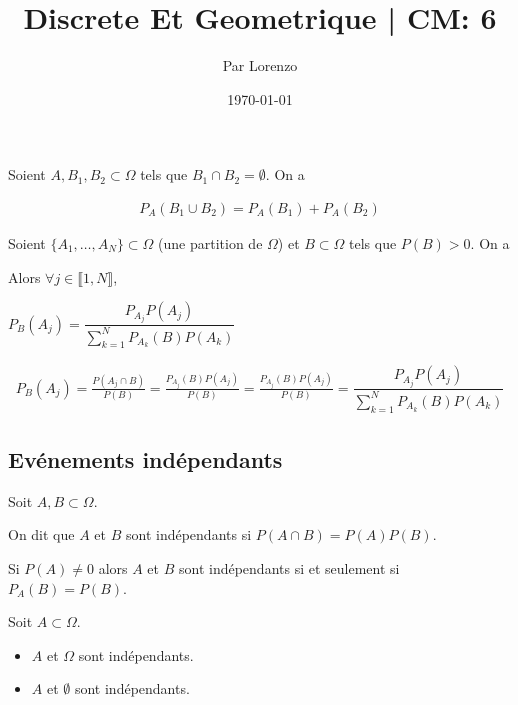 \documentclass[a4paper, 12pt]{article}
\title{Discrete Et Geometrique | CM: 6}
\author{Par Lorenzo}
\date{\today}
\begin{document}
\maketitle

Soient $A, B_1, B_2 \subset \Omega$ tels que $B_1 \cap B_2 = \emptyset$. On a

\begin{align*}
    P_A(B_1 \cup B_2) = P_A(B_1) + P_A(B_2)
\end{align*}

\begin{proposition}
Soient $\{A_1, \dots, A_N\} \subset \Omega$ (une partition de $\Omega$) et $B \subset \Omega$ tels que $P(B) > 0$. On a

Alors $\forall j \in \llbracket 1, N \rrbracket$,

$P_B(A_j) = \dfrac{P_{A_j}P(A_j)}{\sum_{k=1}^{N}P_{A_k}(B)P(A_k)}$
    
\end{proposition}

\begin{demonstration}
    \begin{align*}
        P_B(A_j) = \frac{P(A_j \cap B)}{P(B)} = \frac{P_{A_j}(B)P(A_j)}{P(B)} = \frac{P_{A_j}(B)P(A_j)}{P(B)} = \dfrac{P_{A_j}P(A_j)}{\sum_{k=1}^{N}P_{A_k}(B)P(A_k)}
    \end{align*}
\end{demonstration}

\subsection{Evénements indépendants}

\begin{definition}
    Soit $A, B \subset \Omega$.
    
    On dit que $A$ et $B$ sont indépendants si $P(A \cap B) = P(A)P(B)$.
\end{definition}

\begin{remark}
    Si $P(A) \neq 0$ alors $A$ et $B$ sont indépendants si et seulement si $P_{A}(B) = P(B)$.
\end{remark}

\begin{proposition}
    Soit $A \subset \Omega$.
    \begin{itemize}
        \item $A$ et $\Omega$ sont indépendants.
        \item $A$ et $\emptyset$ sont indépendants.
    \end{itemize}
\end{proposition}
\end{document}
